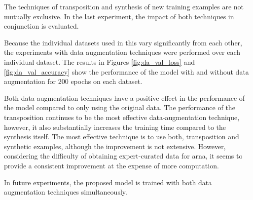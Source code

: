 
The techniques of transposition and synthesis of new
training examples are not mutually exclusive. In the last
experiment, the impact of both techniques in conjunction is
evaluated.

Because the individual datasets used in this \thesisdiss{}
vary significantly from each other, the experiments with
data augmentation techniques were performed over each
individual dataset. The results in Figures
\ref{fig:da_val_loss} and \ref{fig:da_val_accuracy} show the
performance of the model with and without data augmentation
for 200 epochs on each dataset. 




 Both data augmentation techniques have a positive effect in
 the performance of the model compared to only using the
 original data. The performance of the transposition
 continues to be the most effective data-augmentation
 technique, however, it also substantially increases the
 training time compared to the synthesis itself. The most
 effective technique is to use both, transposition and
 synthetic examples, although the improvement is not
 extensive. However, considering the difficulty of obtaining
 expert-curated data for \gls{arna}, it seems to provide a
 consistent improvement at the expense of more computation.

 In future experiments, the proposed model is trained with
 both data augmentation techniques simultaneously.
